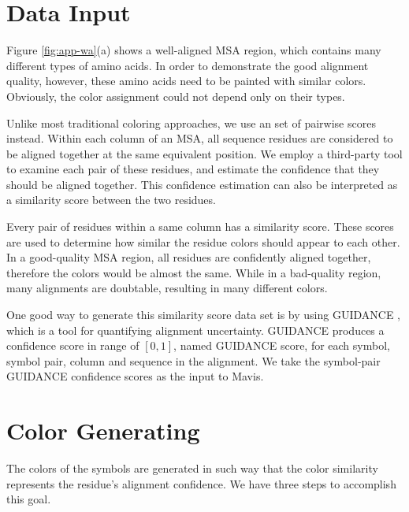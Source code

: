 \section{Data Input}

Figure \ref{fig:app-wa}(a) shows a well-aligned MSA region, which contains many different types of amino acids. In order to demonstrate the good alignment quality, however, these amino acids need to be painted with similar colors. Obviously, the color assignment could not depend only on their types.

Unlike most traditional coloring approaches, we use an set of pairwise scores instead. Within each column of an MSA, all sequence residues are considered to be aligned together at the same equivalent position. We employ a third-party tool to examine each pair of these residues, and estimate the confidence that they should be aligned together. This confidence estimation can also be interpreted as a similarity score between the two residues.

Every pair of residues within a same column has a similarity score. These scores are used to determine how similar the residue colors should appear to each other. In a good-quality MSA region, all residues are confidently aligned together, therefore the colors would be almost the same. While in a bad-quality region, many alignments are doubtable, resulting in many different colors.

One good way to generate this similarity score data set is by using GUIDANCE \cite{Penn:2010aa,Penn:2010ab}, which is a tool for quantifying alignment uncertainty. GUIDANCE produces a confidence score in range of $[0, 1]$, named GUIDANCE score, for each symbol, symbol pair, column and sequence in the alignment. We take the symbol-pair GUIDANCE confidence scores as the input to Mavis.

\section{Color Generating}

The colors of the symbols are generated in such way that the color similarity represents the residue's alignment confidence. We have three steps to accomplish this goal.

